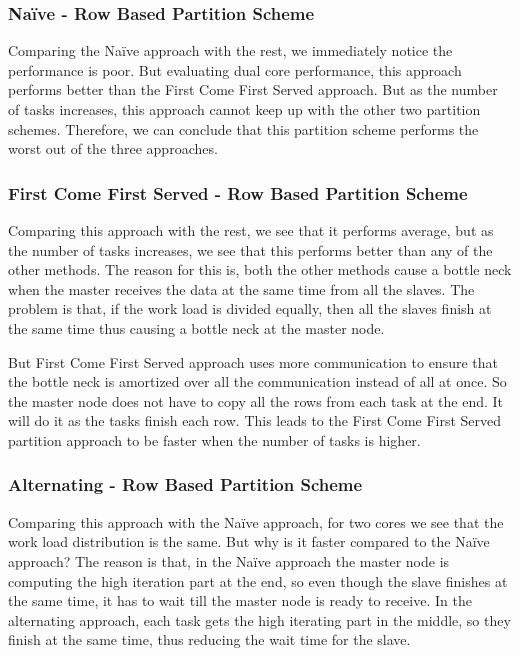 \documentclass[conference]{IEEEtran}
\begin{document}
		\subsubsection{Naïve - Row Based Partition Scheme }
		Comparing the Naïve approach with the rest, we immediately notice the performance is poor. But evaluating dual core performance, this approach performs better than the First Come First Served approach. But as the number of tasks increases, this approach cannot keep up with the other two partition schemes. Therefore, we can conclude that this partition scheme performs the worst out of the three approaches.
	\subsubsection{First Come First Served - Row Based Partition Scheme}
	\label{fcfsex}
		Comparing this approach with the rest, we see that it performs average, but as the number of tasks increases, we see that this performs better than any of the other methods. The reason for this is, both the other methods cause a bottle neck when the master receives the data at the same time from all the slaves. The problem is that, if the work load is divided equally, then all the slaves finish at the same time thus causing a bottle neck at the master node. 
		
		But First Come First Served approach uses more communication to ensure that the bottle neck is amortized over all the communication instead of all at once. So the master node does not have to copy all the rows from each task at the end. It will do it as the tasks finish each row. This leads to the First Come First Served partition approach to be faster when the number of tasks is higher.
	
	\subsubsection{Alternating - Row Based Partition Scheme}
	
	Comparing this approach with the Naïve approach, for two cores we see that the work load distribution is the same. But why is it faster compared to the Naïve approach? The reason is that, in the Naïve approach the master node is computing the high iteration part at the end, so even though the slave finishes at the same time, it has to wait till the master node is ready to receive. In the alternating approach, each task gets the high iterating part in the middle, so they finish at the same time, thus reducing the wait time for the slave.
	
\end{document}
